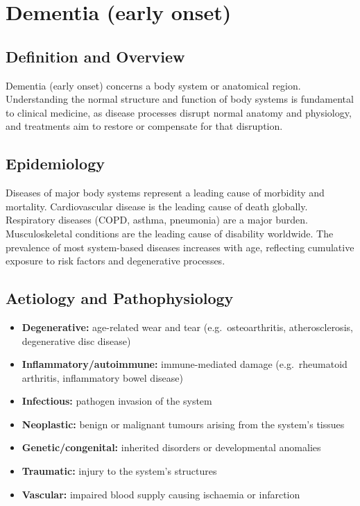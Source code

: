 \chapter{Dementia (early onset)}

\section*{Definition and Overview}
Dementia (early onset) concerns a body system or anatomical region. Understanding the normal structure and function of body systems is fundamental to clinical medicine, as disease processes disrupt normal anatomy and physiology, and treatments aim to restore or compensate for that disruption.

\section*{Epidemiology}
Diseases of major body systems represent a leading cause of morbidity and mortality. Cardiovascular disease is the leading cause of death globally. Respiratory diseases (COPD, asthma, pneumonia) are a major burden. Musculoskeletal conditions are the leading cause of disability worldwide. The prevalence of most system-based diseases increases with age, reflecting cumulative exposure to risk factors and degenerative processes.

\section*{Aetiology and Pathophysiology}
\begin{itemize}
    \item \textbf{Degenerative:} age-related wear and tear (e.g.\ osteoarthritis, atherosclerosis, degenerative disc disease)
    \item \textbf{Inflammatory/autoimmune:} immune-mediated damage (e.g.\ rheumatoid arthritis, inflammatory bowel disease)
    \item \textbf{Infectious:} pathogen invasion of the system
    \item \textbf{Neoplastic:} benign or malignant tumours arising from the system's tissues
    \item \textbf{Genetic/congenital:} inherited disorders or developmental anomalies
    \item \textbf{Traumatic:} injury to the system's structures
    \item \textbf{Vascular:} impaired blood supply causing ischaemia or infarction
\end{itemize}

